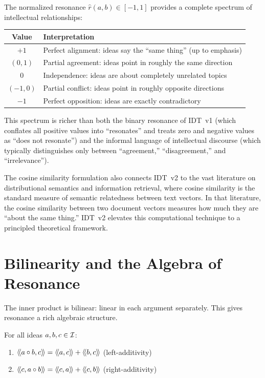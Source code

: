 \begin{interpretation}
\label{interp:spectrum}
The normalized resonance $\hat{r}(a, b) \in [-1, 1]$ provides a complete
spectrum of intellectual relationships:

\begin{center}
\begin{tabular}{cl}
\textbf{Value} & \textbf{Interpretation} \\
\hline
$+1$ & Perfect alignment: ideas say the ``same thing'' (up to emphasis) \\
$(0, 1)$ & Partial agreement: ideas point in roughly the same direction \\
$0$ & Independence: ideas are about completely unrelated topics \\
$(-1, 0)$ & Partial conflict: ideas point in roughly opposite directions \\
$-1$ & Perfect opposition: ideas are exactly contradictory \\
\end{tabular}
\end{center}

This spectrum is richer than both the binary resonance of IDT~v1 (which
conflates all positive values into ``resonates'' and treats zero and negative
values as ``does not resonate'') and the informal language of intellectual
discourse (which typically distinguishes only between ``agreement,''
``disagreement,'' and ``irrelevance'').

The cosine similarity formulation also connects IDT~v2 to the vast literature
on distributional semantics and information retrieval, where cosine similarity
is the standard measure of semantic relatedness between text vectors. In that
literature, the cosine similarity between two document vectors measures how much
they are ``about the same thing.'' IDT~v2 elevates this computational technique
to a principled theoretical framework.
\end{interpretation}


\section{Bilinearity and the Algebra of Resonance}

The inner product is bilinear: linear in each argument separately. This gives
resonance a rich algebraic structure.

\begin{theorem}
\label{thm:bilinearity}
For all ideas $a, b, c \in \mathcal{I}$:
\begin{enumerate}
\item $\langle\!\langle a \circ b, c \rangle\!\rangle = \langle\!\langle a, c \rangle\!\rangle + \langle\!\langle b, c \rangle\!\rangle$ \hfill
(left-additivity)
\item $\langle\!\langle c, a \circ b \rangle\!\rangle = \langle\!\langle c, a \rangle\!\rangle + \langle\!\langle c, b \rangle\!\rangle$ \hfill
(right-additivity)
\end{enumerate}
\end{theorem}

